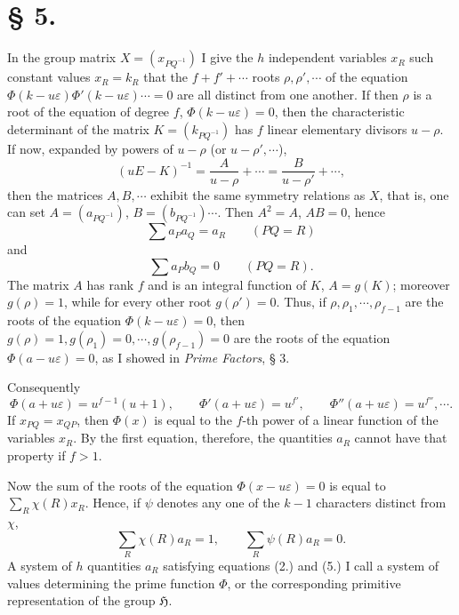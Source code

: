 \documentclass[11pt]{article}
\newcommand{\Hgr}{\mathfrak{H}}
\newcommand{\eps}{\varepsilon}
\begin{document}
\section*{§ 5.}

In the group matrix $X=(x_{PQ^{-1}})$ I give the $h$ independent variables $x_R$ such constant values $x_R=k_R$ that the $f+f'+\cdots$ roots $\rho,\rho',\cdots$ of the equation $\Phi(k-u\eps)\Phi'(k-u\eps)\cdots=0$ are all distinct from one another. If then $\rho$ is a root of the equation of degree $f$, $\Phi(k-u\eps)=0$, then the characteristic determinant of the matrix $K=(k_{PQ^{-1}})$ has $f$ linear elementary divisors $u-\rho$. If now, expanded by powers of $u-\rho$ (or $u-\rho',\cdots$),
\begin{equation}\tag{1.}
(uE-K)^{-1}=\frac{A}{u-\rho}+\cdots=\frac{B}{u-\rho'}+\cdots,
\end{equation}
then the matrices $A,B,\cdots$ exhibit the same symmetry relations as $X$, that is, one can set $A=(a_{PQ^{-1}})$, $B=(b_{PQ^{-1}})\cdots$. Then $A^2=A$, $AB=0$, hence
\begin{equation}\tag{2.}
\sum a_Pa_Q=a_R\qquad(PQ=R)
\end{equation}
and
\begin{equation}\tag{3.}
\sum a_Pb_Q=0\qquad(PQ=R).
\end{equation}
The matrix $A$ has rank $f$ and is an integral function of $K$, $A=g(K)$; moreover $g(\rho)=1$, while for every other root $g(\rho')=0$. Thus, if $\rho,\rho_1,\cdots,\rho_{f-1}$ are the roots of the equation $\Phi(k-u\eps)=0$, then $g(\rho)=1,g(\rho_1)=0,\cdots,g(\rho_{f-1})=0$ are the roots of the equation $\Phi(a-u\eps)=0$, as I showed in \emph{Prime Factors}, § 3.

Consequently
\begin{equation}\tag{4.}
\Phi(a+u\eps)=u^{f-1}(u+1),
\qquad
\Phi'(a+u\eps)=u^{f'},
\qquad
\Phi''(a+u\eps)=u^{f''},\cdots .
\end{equation}
If $x_{PQ}=x_{QP}$, then $\Phi(x)$ is equal to the $f$-th power of a linear function of the variables $x_R$. By the first equation, therefore, the quantities $a_R$ cannot have that property if $f>1$.

Now the sum of the roots of the equation $\Phi(x-u\eps)=0$ is equal to $\sum_R\chi(R)x_R$. Hence, if $\psi$ denotes any one of the $k-1$ characters distinct from $\chi$,
\begin{equation}\tag{5.}
\sum_R\chi(R)a_R=1,
\qquad
\sum_R\psi(R)a_R=0.
\end{equation}
A system of $h$ quantities $a_R$ satisfying equations (2.) and (5.) I call a system of values determining the prime function $\Phi$, or the corresponding primitive representation of the group $\Hgr$.
\end{document}
